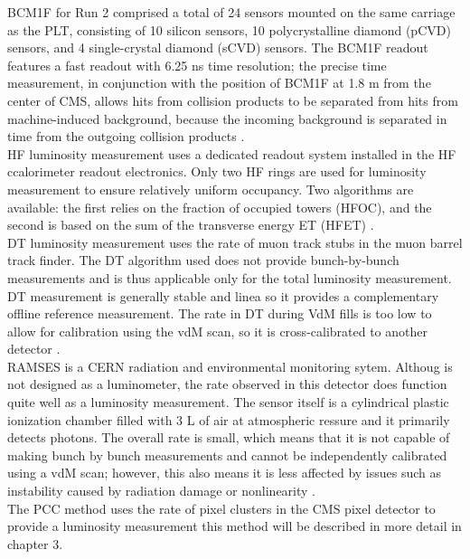 BCM1F for Run 2 comprised a total of 24 sensors mounted on the same carriage as the PLT, consisting of 10 silicon sensors, 10 polycrystalline diamond (pCVD) sensors, and 4 single-crystal diamond (sCVD) sensors. The BCM1F readout features a fast readout with 6.25 ns time resolution; the precise time measurement, in conjunction with the position of BCM1F at 1.8 m from the center of CMS, allows hits from collision products to be separated from hits from machine-induced background, because the incoming background is separated in time from the outgoing collision products  \cite{pas_18}.\\ 

HF luminosity measurement uses a dedicated readout system installed in the HF ccalorimeter readout electronics. Only two HF rings are used for luminosity measurement to ensure relatively uniform occupancy. Two algorithms are available: the first relies on the fraction of occupied towers (HFOC), and the second is based on the sum of the transverse energy ET (HFET)  \cite{pas_18}.\\

DT luminosity measurement uses the rate of muon track stubs in the muon barrel track finder. The DT algorithm used does not provide bunch-by-bunch measurements and is thus applicable only for the total luminosity measurement. DT measurement is generally  stable and linea so it provides a complementary offline reference measurement. The rate in DT during VdM fills is too low to allow for calibration using the vdM scan, so it is cross-calibrated to another detector \cite{pas_18}.\\

RAMSES  is a CERN radiation and environmental monitoring sytem. Althoug is not designed as a luminometer, the rate observed in this detector does function quite well as a luminosity measurement. The sensor itself is a cylindrical plastic ionization chamber filled with 3 L of air at atmospheric ressure and it primarily detects photons.  The overall rate is small, which means that it is not capable of making bunch by bunch measurements and cannot be independently calibrated using a vdM scan; however, this also means it is less affected by issues such as instability caused by radiation damage or nonlinearity \cite{pas_18}.\\

The PCC method uses the rate of pixel clusters in the CMS pixel detector to provide a luminosity measurement this method will be described in more detail in chapter 3.  

